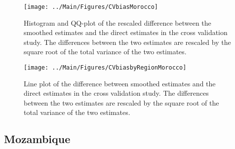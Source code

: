 \documentclass[12pt]{article}\usepackage[]{graphicx}\usepackage[]{color}
\newenvironment{knitrout}{}{} %
\begin{document}
\begin{knitrout}
\color{fgcolor}\begin{figure}[bht]

{\centering \texttt{[image: ../Main/Figures/CVbiasMorocco]} 

}

\caption[Histogram and QQ-plot of the rescaled difference between the smoothed estimates and the direct estimates in the cross validation study]{Histogram and QQ-plot of the rescaled difference between the smoothed estimates and the direct estimates in the cross validation study. The differences between the two estimates are rescaled by the square root of the total variance of the two estimates.}\label{fig:unnamed-chunk-229}
\end{figure}


\end{knitrout}

\begin{knitrout}
\color{fgcolor}\begin{figure}[bht]

{\centering \texttt{[image: ../Main/Figures/CVbiasbyRegionMorocco]} 

}

\caption[Line plot of the difference between smoothed estimates and the direct estimates in the cross validation study]{Line plot of the difference between smoothed estimates and the direct estimates in the cross validation study. The differences between the two estimates are rescaled by the square root of the total variance of the two estimates.}\label{fig:unnamed-chunk-230}
\end{figure}


\end{knitrout}


\clearpage
\subsection{Mozambique}


\end{document}
